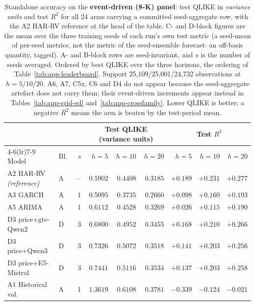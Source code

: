 \begin{table}[p]
\centering
\caption[Standalone accuracy, event-driven panel]{Standalone accuracy on
the \textbf{event-driven (8-K) panel}: test QLIKE in \emph{variance units}
and test $R^2$ for all 24 arms carrying a committed seed-aggregate row,
with the A2 HAR-RV reference at the head of the table. C- and
D-block figures are the mean over the three training seeds of each run's
own test metric (a seed-mean of per-seed metrics, not the metric of the
seed-ensemble forecast: an off-basis quantity, tagged). A- and B-block
rows are seed-invariant, and $s$ is the number of seeds averaged. Ordered
by best QLIKE over the three horizons, the ordering of
Table~\ref{tab:app-leaderboard}. Support 25{,}109/25{,}001/24{,}732
observations at $h = 5/10/20$. A6, A7, C5x, C6 and D4 do not appear because
the seed-aggregate artefact does not carry them; their event-driven
increments appear instead in Tables~\ref{tab:app-grid-ed}
and~\ref{tab:app-crossfamily}. Lower QLIKE is better; a negative $R^2$
means the arm is beaten by the test-period mean.}
\label{tab:app-standalone-ed}
\singlespacing\small
\setlength{\tabcolsep}{4pt}
\begin{tabular}{@{}llrrrrrrr@{}}
\toprule
& & & \multicolumn{3}{c}{Test QLIKE (variance units)} & \multicolumn{3}{c}{Test $R^2$} \\
\cmidrule(lr){4-6}\cmidrule(lr){7-9}
Model & Bl. & $s$ & $h{=}5$ & $h{=}10$ & $h{=}20$ & $h{=}5$ & $h{=}10$ & $h{=}20$ \\
\midrule
A2 HAR-RV \emph{(reference)} & A & --- & $0.5902$ & $0.4408$ & $0.3185$ & $+0.189$ & $+0.231$ & $+0.277$ \\
\addlinespace
A3 GARCH & A & 1 & $0.5095$ & $0.3735$ & $0.2660$ & $+0.098$ & $+0.160$ & $+0.193$ \\
A5 ARIMA & A & 1 & $0.6112$ & $0.4528$ & $0.3269$ & $+0.026$ & $+0.115$ & $+0.190$ \\
D3 price+gte-Qwen2 & D & 3 & $0.6800$ & $0.4952$ & $0.3455$ & $+0.168$ & $+0.210$ & $+0.266$ \\
D3 price+Qwen3 & D & 3 & $0.7326$ & $0.5072$ & $0.3518$ & $+0.141$ & $+0.203$ & $+0.256$ \\
D3 price+E5-Mistral & D & 3 & $0.7441$ & $0.5116$ & $0.3534$ & $+0.137$ & $+0.203$ & $+0.258$ \\
A1 Historical vol. & A & 1 & $1.3619$ & $0.6108$ & $0.3781$ & $-0.339$ & $-0.124$ & $-0.021$ \\

\end{tabular}
\end{table}
